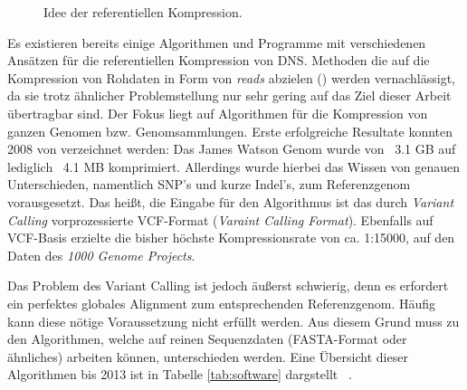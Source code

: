 \documentclass[12pt]{article}
\begin{document}
\begin{figure}
\caption{\label{fig:refKomp}\footnotesize Idee der referentiellen Kompression. }
\end{figure}

Es existieren bereits einige Algorithmen und Programme mit verschiedenen Ansätzen für die referentiellen Kompression von DNS. Methoden die auf die Kompression von Rohdaten in Form von \textit{reads} abzielen (\cite{deorowicz11fastq}) werden vernachlässigt, da sie trotz ähnlicher Problemstellung nur sehr gering auf das Ziel dieser Arbeit übertragbar sind. Der Fokus liegt auf Algorithmen für die Kompression von ganzen Genomen bzw. Genomsammlungen.
Erste erfolgreiche Resultate konnten 2008 von \cite{christley09email} verzeichnet werden: Das James Watson Genom wurde von ~3.1 GB auf lediglich ~4.1 MB komprimiert. Allerdings wurde hierbei das Wissen von genauen Unterschieden, namentlich SNP's und kurze Indel's, zum Referenzgenom vorausgesetzt. Das heißt, die Eingabe für den Algorithmus ist das durch \textit{Variant Calling} vorprozessierte VCF-Format (\textit{Varaint Calling Format}). Ebenfalls auf VCF-Basis erzielte \cite{deorowicz13TDC} die bisher höchste Kompressionsrate von ca. 1:15000, auf den Daten des \textit{1000 Genome Projects}.

Das Problem des Variant Calling ist jedoch äußerst schwierig, denn es erfordert ein perfektes globales Alignment zum entsprechenden Referenzgenom. Häufig kann diese nötige Voraussetzung  nicht erfüllt werden. Aus diesem Grund muss zu den Algorithmen, welche auf reinen Sequenzdaten (FASTA-Format oder ähnliches) arbeiten können, unterschieden werden. Eine Übersicht dieser Algorithmen bis 2013 ist in Tabelle \ref{tab:software} dargstellt ~\cite{deorowicz13info}.
\end{document}
